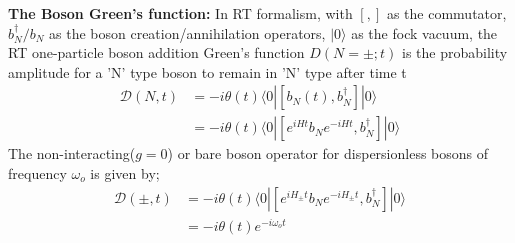 \documentclass{article}
\begin{document}
\textbf{The Boson Green's function: }
In RT formalism, with $[ , ]$ as the commutator, $b_N^\dagger/b_N$ as the boson creation/annihilation operators, ${|0\rangle}$ as the fock vacuum, the RT one-particle boson addition Green's function $D(N=\pm;t)$ is the probability amplitude for a 'N' type boson to remain in 'N' type after time t
\begin{equation}
\begin{aligned}
    \mathcal{D}(N,t) &= -i \theta(t)\langle 0|[b_N(t) ,{b_N^{\dagger}}]|0\rangle\\
     &= -i \theta(t)\langle 0|[e^{iHt}b_N e^{-iHt} ,{b_N^{\dagger}}]|0\rangle
\end{aligned}
\label{Boson greens}
\end{equation}
The non-interacting($g=0$) or bare boson operator for dispersionless bosons of frequency $\omega_o$ is given by;
\begin{equation}
\begin{aligned}
    \mathcal{D}(\pm,t) &=-i \theta(t)\langle 0|[e^{iH_\pm t}b_N e^{-iH_\pm t} ,{b_N^{\dagger}}]|0\rangle\\
    &=-i \theta(t)e^{- i\omega_o t}
\end{aligned}
    \label{Bare boson greens}
\end{equation} 
\end{document}
